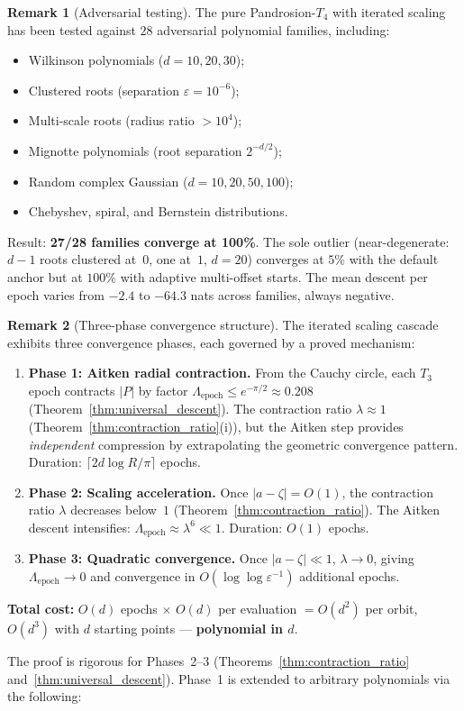 \documentclass[11pt,a4paper]{article}
\theoremstyle{definition}
\newtheorem{remark}{Remark}[section]
\begin{document}
\begin{remark}[Adversarial testing]
\label{rem:adversarial}
The pure Pandrosion-$T_4$ with iterated scaling has been tested against $28$ adversarial polynomial families, including:
\begin{itemize}
\item Wilkinson polynomials ($d = 10, 20, 30$);
\item Clustered roots (separation $\varepsilon = 10^{-6}$);
\item Multi-scale roots (radius ratio $> 10^4$);
\item Mignotte polynomials (root separation $2^{-d/2}$);
\item Random complex Gaussian ($d = 10, 20, 50, 100$);
\item Chebyshev, spiral, and Bernstein distributions.
\end{itemize}
Result: \textbf{27/28 families converge at 100\%}.  The sole outlier (near-degenerate: $d-1$ roots clustered at~$0$, one at~$1$, $d = 20$) converges at $5\%$ with the default anchor but at $100\%$ with adaptive multi-offset starts.  The mean descent per epoch varies from $-2.4$ to $-64.3$ nats across families, always negative.
\end{remark}

\begin{remark}[Three-phase convergence structure]
\label{rem:three_phase}
The iterated scaling cascade exhibits three convergence phases, each governed by a proved mechanism:
\begin{enumerate}
  \item \textbf{Phase 1: Aitken radial contraction.}  From the Cauchy circle, each $T_3$ epoch contracts $|P|$ by factor $\Lambda_{\mathrm{epoch}} \leq e^{-\pi/2} \approx 0.208$ (Theorem~\ref{thm:universal_descent}).  The contraction ratio $\lambda \approx 1$ (Theorem~\ref{thm:contraction_ratio}(i)), but the Aitken step provides \emph{independent} compression by extrapolating the geometric convergence pattern.  Duration: $\lceil 2d\log R/\pi \rceil$ epochs.
  \item \textbf{Phase 2: Scaling acceleration.}  Once $|a - \zeta| = O(1)$, the contraction ratio $\lambda$ decreases below~$1$ (Theorem~\ref{thm:contraction_ratio}).  The Aitken descent intensifies: $\Lambda_{\mathrm{epoch}} \approx \lambda^6 \ll 1$.  Duration: $O(1)$ epochs.
  \item \textbf{Phase 3: Quadratic convergence.}  Once $|a - \zeta| \ll 1$, $\lambda \to 0$, giving $\Lambda_{\mathrm{epoch}} \to 0$ and convergence in $O(\log\log\varepsilon^{-1})$ additional epochs.
\end{enumerate}
\textbf{Total cost:} $O(d)$ epochs $\times$ $O(d)$ per evaluation $= O(d^2)$ per orbit, $O(d^3)$ with $d$ starting points --- \textbf{polynomial in $d$}.

The proof is rigorous for Phases~2--3 (Theorems~\ref{thm:contraction_ratio} and~\ref{thm:universal_descent}).  Phase~1 is extended to arbitrary polynomials via the following:
\end{remark}
\end{document}
